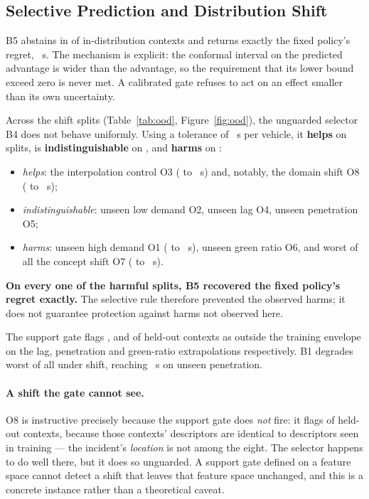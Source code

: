 \subsection{Selective Prediction and Distribution Shift}

B5 abstains in \NumAbstainRate{} of in-distribution contexts and returns exactly
the fixed policy's regret, \NumBFiveRegret~s. The mechanism is explicit: the
conformal interval on the predicted advantage is wider than the advantage, so
the requirement that its lower bound exceed zero is never met. A calibrated gate
refuses to act on an effect smaller than its own uncertainty.

Across the \NumOODNTotal{} shift splits (Table~\ref{tab:ood},
Figure~\ref{fig:ood}), the unguarded selector B4 does not behave uniformly. Using
a tolerance of \NumOODTolerance~s per vehicle, it \textbf{helps} on
\NumOODNHelps{} splits, is \textbf{indistinguishable} on \NumOODNNeutral{}, and
\textbf{harms} on \NumOODNHarms{}:
\begin{itemize}
\item \emph{helps}: the interpolation control O3 (\NumOODThreeMidBZero{} to
\NumOODThreeMidBFour~s) and, notably, the domain shift O8
(\NumOODEightNorthBZero{} to \NumOODEightNorthBFour~s);
\item \emph{indistinguishable}: unseen low demand O2, unseen lag O4, unseen
penetration O5;
\item \emph{harms}: unseen high demand O1 (\NumOODOneHighBZero{} to
\NumOODOneHighBFour~s), unseen green ratio O6, and worst of all the concept
shift O7 (\NumOODSevenIncBZero{} to \NumOODSevenIncBFour~s).
\end{itemize}
\textbf{On every one of the \NumOODNHarms{} harmful splits, B5 recovered the
fixed policy's regret exactly.} The selective rule therefore prevented the
observed harms; it does not guarantee protection against harms not observed
here.

The support gate flags \NumOODFourLagSupport{}, \NumOODFivePenSupport{} and
\NumOODSixGreenSupport{} of held-out contexts as outside the training envelope
on the lag, penetration and green-ratio extrapolations respectively. B1 degrades
worst of all under shift, reaching \NumOODFivePenBOne~s on unseen penetration.

\paragraph{A shift the gate cannot see.} O8 is instructive precisely because the
support gate does \emph{not} fire: it flags \NumOODEightNorthSupport{} of
held-out contexts, because those contexts' descriptors are identical to
descriptors seen in training --- the incident's \emph{location} is not among the
eight. The selector happens to do well there, but it does so unguarded. A
support gate defined on a feature space cannot detect a shift that leaves that
feature space unchanged, and this is a concrete instance rather than a
theoretical caveat.

